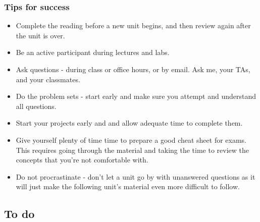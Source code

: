 \documentclass[slidestop,compress,mathserif,12pt,t,professionalfonts,xcolor=table]{beamer}
\begin{document}

\begin{frame}
\frametitle{Tips for success}

{\footnotesize
\begin{itemize}[<alert@+>]
\item Complete the reading before a new unit begins, and then review again after the unit is over.
\item Be an active participant during lectures and labs.
\item Ask questions - during class or office hours, or by email. Ask me, your TAs, and your classmates.
\item Do the problem sets - start early and make sure you attempt and understand all questions.
\item Start your projects early and and allow adequate time to complete them.
\item Give yourself plenty of time time to prepare a good cheat sheet for exams. This requires going through the material and taking the time to review the concepts that you're not comfortable with.
\item Do not procrastinate - don't let a unit go by with unanswered questions as it will just make the following unit's material even more difficult to follow. 
\end{itemize}
}

\end{frame}


\subsection{To do}

\end{document}
